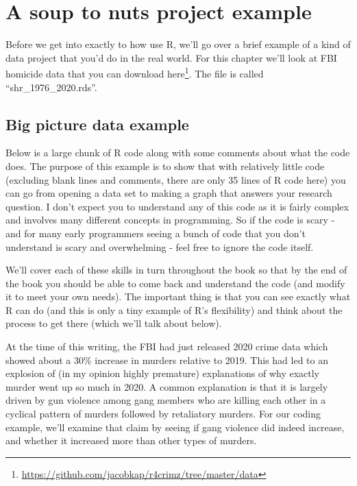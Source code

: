\documentclass[
]{krantz}
\renewcommand{\href}[2]{#2\footnote{\url{#1}}}
\begin{document}
\mainmatter

\hypertarget{a-soup-to-nuts-project-example}{%
\chapter{A soup to nuts project
example}\label{a-soup-to-nuts-project-example}}

Before we get into exactly to how use R, we'll go over a
brief example of a kind of data project that you'd do in the
real world. For this chapter we'll look at FBI homicide data
that you can download
\href{https://github.com/jacobkap/r4crimz/tree/master/data}{here}.
The file is called ``shr\_1976\_2020.rds''.

\hypertarget{big-picture-data-example}{%
\section{Big picture data
example}\label{big-picture-data-example}}

Below is a large chunk of R code along with some comments
about what the code does. The purpose of this example is to
show that with relatively little code (excluding blank lines
and comments, there are only 35 lines of R code here) you
can go from opening a data set to making a graph that
answers your research question. I don't expect you to
understand any of this code as it is fairly complex and
involves many different concepts in programming. So if the
code is scary - and for many early programmers seeing a
bunch of code that you don't understand is scary and
overwhelming - feel free to ignore the code itself.

We'll cover each of these skills in turn throughout the book
so that by the end of the book you should be able to come
back and understand the code (and modify it to meet your own
needs). The important thing is that you can see exactly what
R can do (and this is only a tiny example of R's
flexibility) and think about the process to get there (which
we'll talk about below).

At the time of this writing, the FBI had just released 2020
crime data which showed about a 30\% increase in murders
relative to 2019. This had led to an explosion of (in my
opinion highly premature) explanations of why exactly murder
went up so much in 2020. A common explanation is that it is
largely driven by gun violence among gang members who are
killing each other in a cyclical pattern of murders followed
by retaliatory murders. For our coding example, we'll
examine that claim by seeing if gang violence did indeed
increase, and whether it increased more than other types of
murders.
\end{document}
